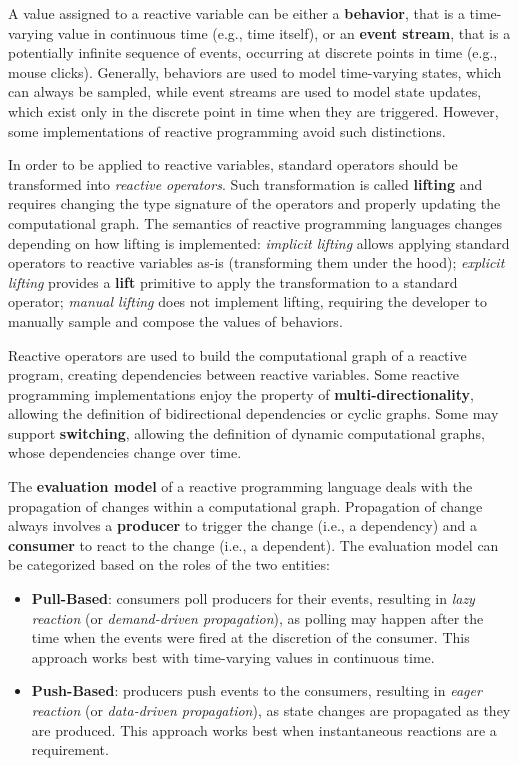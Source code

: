 A value assigned to a reactive variable can be either a \textbf{behavior}, that
is a time-varying value in continuous time (e.g., time itself), or an
\textbf{event stream}, that is a potentially infinite sequence of events,
occurring at discrete points in time (e.g., mouse clicks). Generally, behaviors
are used to model time-varying states, which can always be sampled, while event
streams are used to model state updates, which exist only in the discrete point
in time when they are triggered. However, some implementations of reactive
programming avoid such distinctions.

In order to be applied to reactive variables, standard operators should be
transformed into \textit{reactive operators}. Such transformation is called
\textbf{lifting} and requires changing the type signature of the operators and
properly updating the computational graph. The semantics of reactive
programming languages changes depending on how lifting is implemented:
\textit{implicit lifting} allows applying standard operators to reactive
variables as-is (transforming them under the hood); \textit{explicit lifting}
provides a \textbf{lift} primitive to apply the transformation to a standard
operator; \textit{manual lifting} does not implement lifting, requiring the
developer to manually sample and compose the values of behaviors.

Reactive operators are used to build the computational graph of a reactive
program, creating dependencies between reactive variables. Some reactive
programming implementations enjoy the property of
\textbf{multi-directionality}, allowing the definition of bidirectional
dependencies or cyclic graphs. Some may support \textbf{switching}, allowing
the definition of dynamic computational graphs, whose dependencies change over
time.

The \textbf{evaluation model} of a reactive programming language deals with the
propagation of changes within a computational graph. Propagation of change
always involves a \textbf{producer} to trigger the change (i.e., a dependency)
and a \textbf{consumer} to react to the change (i.e., a dependent). The
evaluation model can be categorized based on the roles of the two entities:
\begin{itemize}
  \item \textbf{Pull-Based}: consumers poll producers for their events,
        resulting in \textit{lazy reaction} (or \textit{demand-driven propagation}),
        as polling may happen after the time when the events were fired at the
        discretion of the consumer. This approach works best with time-varying
        values in continuous time.
  \item \textbf{Push-Based}: producers push events to the consumers, resulting
        in \textit{eager reaction} (or \textit{data-driven propagation}), as
        state changes are propagated as they are produced. This approach works
        best when instantaneous reactions are a requirement.
\end{itemize}


